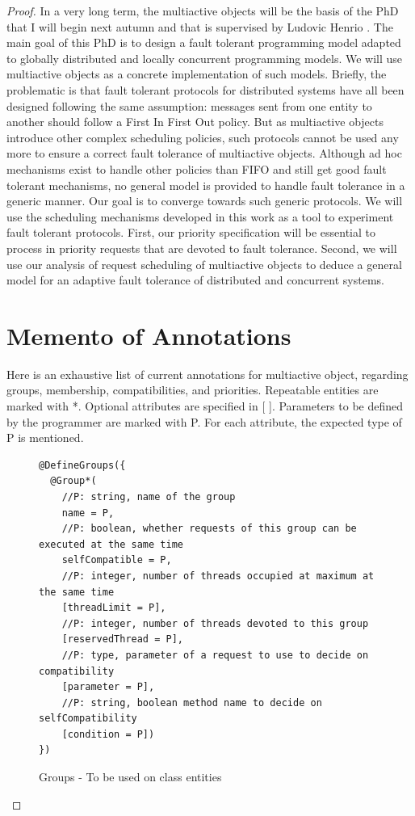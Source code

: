 \documentclass[11pt]{report}
\begin{document}
\begin{proof}
In a very long term, the multiactive objects will be the basis of the PhD that I will begin next autumn and that is supervised by Ludovic Henrio \cite{ref:these}. The main goal of this PhD is to design a fault tolerant programming model adapted to globally distributed and locally concurrent programming models. We will use multiactive objects as a concrete implementation of such models. Briefly, the problematic is that fault tolerant protocols for distributed systems have all been designed following the same assumption: messages sent from one entity to another should follow a First In First Out policy. But as multiactive objects introduce other complex scheduling policies, such protocols cannot be used any more to ensure a correct fault tolerance of multiactive objects. Although ad hoc mechanisms exist to handle other policies than FIFO and still get good fault tolerant mechanisms, no general model is provided to handle fault tolerance in a generic manner. Our goal is to converge towards such generic protocols. We will use the scheduling mechanisms developed in this work as a tool to experiment fault tolerant protocols. First, our priority specification will be essential to process in priority requests that are devoted to fault tolerance. Second, we will use our analysis of request scheduling of multiactive objects to deduce a general model for an adaptive fault tolerance of distributed and concurrent systems.





\appendix
\chapter{Memento of Annotations}

Here is an exhaustive list of current annotations for multiactive object, regarding groups, membership, compatibilities, and priorities. Repeatable entities are marked with *. Optional attributes are specified in [ ]. Parameters to be defined by the programmer are marked with P. For each attribute, the expected type of P is mentioned.\\

\begin{figure}[!ht]
	\lstset{language=java, numbers=left, numberstyle=\tiny, stepnumber=1, numbersep=5pt, basicstyle=\footnotesize}
	\begin{lstlisting}[frame=single]
@DefineGroups({
  @Group*(
    //P: string, name of the group
    name = P, 
    //P: boolean, whether requests of this group can be executed at the same time
    selfCompatible = P, 
    //P: integer, number of threads occupied at maximum at the same time
    [threadLimit = P],
    //P: integer, number of threads devoted to this group
    [reservedThread = P], 
    //P: type, parameter of a request to use to decide on compatibility
    [parameter = P],
    //P: string, boolean method name to decide on selfCompatibility
    [condition = P])
})
 	\end{lstlisting}
\caption{Groups - To be used on class entities}
\label{fig:group}
\end{figure}


\end{proof}
\end{document}
